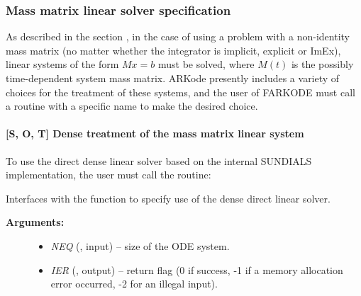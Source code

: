 \documentclass[letterpaper,10pt,english]{sphinxmanual}
\begin{document}
\subsubsection{Mass matrix linear solver specification}
\label{f_interface/Usage:finterface-masslinearsolver}\label{f_interface/Usage:mass-matrix-linear-solver-specification}
As described in the section {\hyperref[Mathematics:mathematics-masssolve]{\emph{}}}, in the case
of using a problem with a non-identity mass matrix (no matter whether
the integrator is implicit, explicit or ImEx), linear systems of the
form \(Mx=b\) must be solved, where \(M(t)\) is the possibly
time-dependent system mass matrix.  ARKode presently includes
a variety of choices for the treatment of these systems, and the user
of FARKODE must call a routine with a specific name to make the
desired choice.


\paragraph{{[}\textbf{S}, \textbf{O}, \textbf{T}{]} Dense treatment of the mass matrix linear system}
\label{f_interface/Usage:s-o-t-dense-treatment-of-the-mass-matrix-linear-system}
To use the direct dense linear solver based on the internal SUNDIALS
implementation, the user must call the {\hyperref[f_interface/Usage:f/_/FARKMASSDENSE]{\emph{}}} routine:

\begin{fulllineitems}
\label{f_interface/Usage:f/_/FARKMASSDENSE}
Interfaces with the {\hyperref[c_interface/User_callable:c.ARKMassDense]{\emph{}}} function to
specify use of the dense direct linear solver.
\begin{description}
\item[{\textbf{Arguments:}}] \leavevmode\begin{itemize}
\item {} 
\emph{NEQ} (, input) -- size of the ODE system.

\item {} 
\emph{IER} (, output) -- return flag (0 if success, -1 if a memory allocation
error occurred, -2 for an illegal input).

\end{itemize}

\end{description}

\end{fulllineitems}
\end{document}

